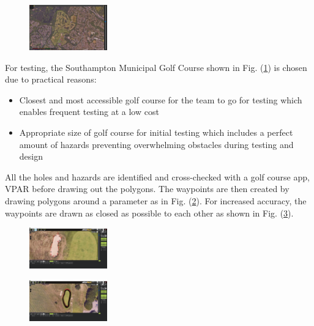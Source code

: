 \documentclass[11pt,landscape]{article}
\begin{document}
\begin{multicols}{3}
\begin{figure}[H]
    \begin{center}
        \includegraphics[width=0.3\textwidth]{Municipal.png}
        \label{fig:municipal}
    \end{center}
\end{figure}

For testing, the Southampton Municipal Golf Course shown in Fig. (\ref{fig:municipal}) is chosen due to
practical reasons: 

\begin{itemize}
    \item Closest and most accessible golf course for the team to go for testing
    which enables frequent testing at a low cost
    \item Appropriate size of golf course for initial testing which includes a
    perfect amount of hazards preventing overwhelming obstacles during testing
    and design 
\end{itemize}

All the holes and hazards are identified and cross-checked with a golf course
app, VPAR before drawing out the polygons. The waypoints are then created by
drawing polygons around a parameter as in Fig. (\ref{fig:poly2}). For increased accuracy, the
waypoints are drawn as closed as possible to each other as shown in Fig. (\ref{fig:poly1}).

\begin{figure}[H]
    \begin{center}
        \includegraphics[width=0.3\textwidth]{polygon 2.png}
        \label{fig:poly2}
    \end{center}
\end{figure}

\begin{figure}[H]
    \begin{center}
        \includegraphics[width=0.3\textwidth]{polygon 1.png}
        \label{fig:poly1}
    \end{center}
\end{figure}


\end{multicols}
\end{document}
